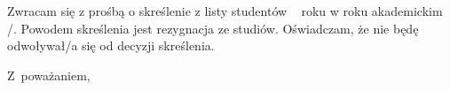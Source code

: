 \documentclass{wmiisubmission}
\begin{document}
\cracowdate
{}
\studentaddress
\addressee{\piotrniemiec}

\vskip 3.0cm


\vskip 0.5cm

Zwracam się z prośbą o skreślenie z listy studentów \fillField{2cm}~ roku w roku
akademickim \fillField{1cm}/\fillField{1cm}. Powodem skreślenia jest rezygnacja
ze studiów.
Oświadczam, że nie będę odwoływał/a się od decyzji skreślenia.

\vskip 2.0cm

\hspace{\fill} Z~poważaniem, \hspace{2.0cm}
\vskip 4.0cm

\end{document}
